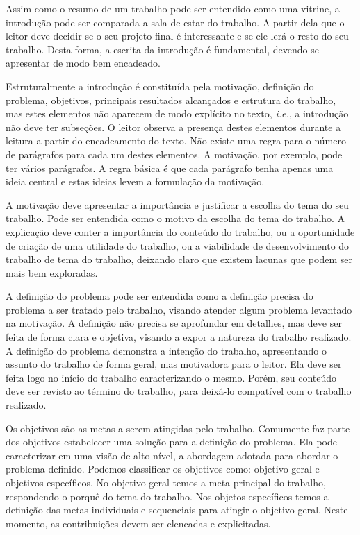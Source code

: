 \documentclass[12pt]{article}
\begin{document}
	Assim como o resumo de um trabalho pode ser entendido como uma vitrine, a introdução pode ser comparada a sala de estar do trabalho. A partir dela que o leitor deve decidir se o seu projeto final é interessante e se ele lerá o resto do seu trabalho. Desta forma, a escrita da introdução é fundamental, devendo se apresentar de modo bem encadeado. 
	
	Estruturalmente a introdução é constituída pela motivação, definição do problema, objetivos, principais resultados alcançados e estrutura do trabalho, mas estes elementos não aparecem de modo explícito no texto, \emph{i.e.}, a introdução não deve ter subseções. O leitor observa a presença destes elementos durante a leitura a partir do encadeamento do texto. Não existe uma regra para o número de parágrafos para cada um destes elementos. A motivação, por exemplo, pode ter vários parágrafos. A regra básica é que cada parágrafo tenha apenas uma ideia central e estas ideias levem a formulação da motivação. 
	
	A motivação deve apresentar a importância e justificar a escolha do tema do seu trabalho. Pode ser entendida como o motivo da escolha do tema do trabalho. A explicação deve conter a importância do conteúdo do trabalho, ou a oportunidade de criação de uma utilidade do trabalho, ou a viabilidade de desenvolvimento do trabalho de tema do trabalho, deixando claro que existem lacunas que podem ser mais bem exploradas. 
	
	A definição do problema pode ser entendida como a definição precisa do problema a ser tratado pelo trabalho, visando atender algum problema levantado na motivação. A definição não precisa se aprofundar em detalhes, mas deve ser feita de forma clara e objetiva, visando a expor a natureza do trabalho realizado. A definição do problema demonstra a intenção do trabalho, apresentando o assunto do trabalho de forma geral, mas motivadora para o leitor. Ela deve ser feita logo no início do trabalho caracterizando o mesmo. Porém, seu conteúdo deve ser revisto ao término do trabalho, para deixá-lo compatível com o trabalho realizado.
	
	Os objetivos são as metas a serem atingidas pelo trabalho. Comumente faz parte dos objetivos estabelecer uma solução para a definição do problema. Ela pode caracterizar em uma visão de alto nível, a abordagem adotada para abordar o problema definido. Podemos classificar os objetivos como: objetivo geral e objetivos específicos. No objetivo geral temos a meta principal do trabalho, respondendo o porquê do tema do trabalho. Nos objetos específicos temos a definição das metas individuais e sequenciais para atingir o objetivo geral. Neste momento, as contribuições devem ser elencadas e explicitadas.
	
\end{document}
